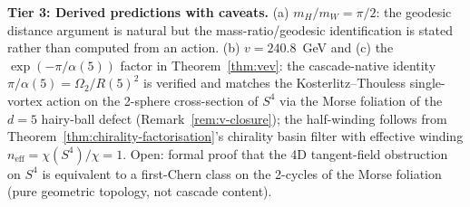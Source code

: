 \documentclass[12pt,a4paper]{article}
\begin{document}
\textbf{Tier 3: Derived predictions with caveats.} (a) $m_H/m_W = \pi/2$: the geodesic distance argument is natural but the mass-ratio/geodesic identification is stated rather than computed from an action. (b) $v = 240.8$~GeV and (c) the $\exp(-\pi/\alpha(5))$ factor in Theorem~\ref{thm:vev}: the cascade-native identity $\pi/\alpha(5) = \Omega_2/R(5)^2$ is verified and matches the Kosterlitz--Thouless single-vortex action on the 2-sphere cross-section of $S^4$ via the Morse foliation of the $d = 5$ hairy-ball defect (Remark~\ref{rem:v-closure}); the half-winding follows from Theorem~\ref{thm:chirality-factorisation}'s chirality basin filter with effective winding $n_{\mathrm{eff}} = \chi(S^4)/\chi = 1$. Open: formal proof that the 4D tangent-field obstruction on $S^4$ is equivalent to a first-Chern class on the 2-cycles of the Morse foliation (pure geometric topology, not cascade content).
\end{document}
